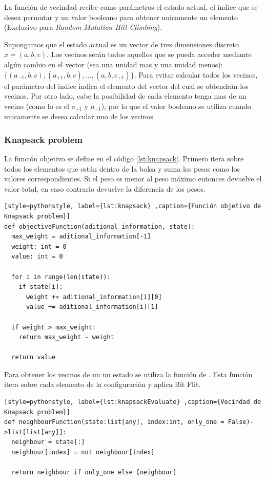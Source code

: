 \documentclass[12pt,twoside]{article}
\begin{document}
La función de vecindad recibe como parámetros el estado actual, el indice que se desea permutar y un valor booleano para obtener unicamente un elemento (Exclusivo para \textit{Random Mutation Hill Climbing}).

Supongamos que el estado actual es un vector de tres dimensiones discreto $x = (a,b,c)$. Los vecinos serán todos aquellos que se pueda acceder mediante algún cambio en el vector (sea una unidad mas y una unidad menos): $\{ (a_{-1},b,c), (a_{+1},b,c), \dots , (a,b,c_{+1}) \}$. Para evitar calcular todos los vecinos, el parámetro del indice indica el elemento del vector del cual se obtendrán los vecinos. Por otro lado, cabe la posibilidad de cada elemento tenga mas de un vecino (como lo es el $a_{+1}$ y $a_{-1}$), por lo que el valor booleano se utiliza cuando unicamente se desea calcular uno de los vecinos.

\clearpage
\subsubsection{Knapsack problem}

La función objetivo se define en el código \ref{lst:knapsack}. Primero itera sobre todos los elementos que están dentro de la bolsa y suma los pesos como los valores correspondientes. Si el peso es menor al peso máximo entonces devuelve el valor total, en caso contrario devuelve la diferencia de los pesos.

\begin{lstlisting}[style=pythonstyle, label={lst:knapsack} ,caption={Función objetivo de Knapsack problem}]
def objectiveFunction(aditional_information, state):
  max_weight = aditional_information[-1]
  weight: int = 0
  value: int = 0

  for i in range(len(state)):
    if state[i]:
      weight += aditional_information[i][0]
      value += aditional_information[i][1]

  if weight > max_weight:
    return max_weight - weight
    
  return value
\end{lstlisting}

Para obtener los vecinos de un un estado se utiliza la función de \cite{lst:knapsackEvaluate}. Esta función itera sobre cada elemento de la configuración y aplica Bit Flit.

\begin{lstlisting}[style=pythonstyle, label={lst:knapsackEvaluate} ,caption={Vecindad de Knapsack problem}]
def neighbourFunction(state:list[any], index:int, only_one = False)->list[list[any]]:
  neighbour = state[:]
  neighbour[index] = not neighbour[index]

  return neighbour if only_one else [neighbour]
\end{lstlisting}
\end{document}
